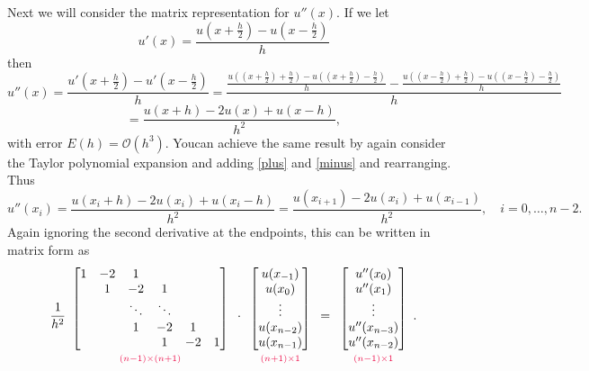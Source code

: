 \noindent Next we will consider the matrix representation for $u''(x)$.
If we let
\[u'(x)=\frac{u(x+\frac{h}{2})-u(x-\frac{h}{2})}{h}\]
then
\[u''(x)=\frac{u'(x+\frac{h}{2})-u'(x-\frac{h}{2})}{h}=\frac{\frac{u((x+\frac{h}{2})+\frac{h}{2})-u((x+\frac{h}{2})-\frac{h}{2})}{h}-\frac{u((x-\frac{h}{2})+\frac{h}{2})-u((x-\frac{h}{2})-\frac{h}{2})}{h}}{h}\]
\[= \frac{u(x+h) - 2u(x) + u(x-h)}{h^2}, \]
with error $E(h) = \mathcal{O}(h^3)$.
Youcan achieve the same result by again consider the Taylor polynomial expansion and adding \eqref{plus} and \eqref{minus} and rearranging.
Thus
\[u''(x_i) =\frac{u(x_i+h) - 2u(x_i) + u(x_i-h)}{h^2}= \frac{u(x_{i+1}) - 2u(x_i) + u(x_{i-1})}{h^2}, \quad i = 0, \ldots, n-2.\]
Again ignoring the second derivative at the endpoints, this can be written in matrix form as
\begin{align}
\frac{1}{h^2}
\begin{array}{c}
\begin{bmatrix}
1 & -2 & 1 & \\
& 1 & -2 & 1  \\
& &\ddots &\ddots & \\
& & 1 & -2 & 1 \\
& & & 1 & -2 & 1
\end{bmatrix}\\
{\scriptstyle\textcolor{red}{(n-1)\times(n+1)}}
\end{array}\cdot
\begin{array}{c}
\begin{bmatrix}
u(x_{-1}) \\ u(x_0)\\ \vdots  \\ u(x_{n-2}) \\ u(x_{n-1})
\end{bmatrix}\\
{\scriptstyle\textcolor{red}{(n+1)\times1}}
\end{array}
 =
 \begin{array}{c}
\begin{bmatrix}
u''(x_0) \\ u''(x_1)\\ \vdots  \\ u''(x_{n-3}) \\ u''(x_{n-2})
\end{bmatrix}\\
{\scriptstyle\textcolor{red}{(n-1)\times1}}
\label{finitedifference2:uppp}
\end{array}.
\end{align}

